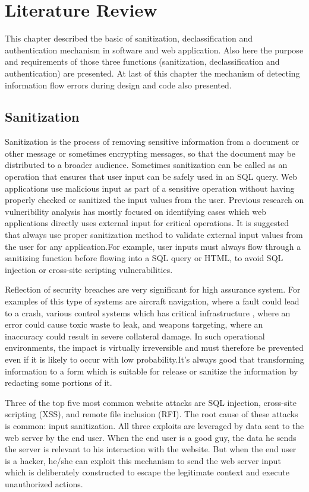 \chapter{Literature Review}
This chapter described the basic of sanitization, declassification and authentication mechanism in software and web application. Also here the purpose and requirements of those three functions (sanitization, declassification and authentication) are presented. At last of this chapter the mechanism of detecting information flow errors during design and code also presented.

\section{Sanitization}
Sanitization is the process of removing sensitive information from a document or other message or sometimes encrypting messages, so that the document may be distributed to a broader audience. Sometimes sanitization can be called as an operation that ensures that user input can be safely used in an SQL query. Web applications use malicious input as part of a sensitive operation without having properly checked or sanitized the input values from the user. Previous research on vulneribility analysis has mostly focused on identifying cases which web applications directly uses external input for critical operations. It is suggested that always use proper sanitization method to validate external input values from the user for any application.For example, user inputs must always flow through a sanitizing function before flowing into a SQL query or HTML, to avoid SQL injection or cross-site scripting vulnerabilities.

Reflection of security breaches are very significant for high assurance system. For examples of this type of systems are aircraft navigation, where a fault could lead to a crash, various control systems which has critical infrastructure , where an error 
could cause toxic waste to leak, and weapons targeting, where an inaccuracy could result in severe collateral damage. In such
operational environments, the impact is virtually irreversible and must therefore be prevented even if it is likely to occur
with low probability.It's always good that transforming information to a form which is suitable for release or sanitize the information by redacting some portions of it.

Three of the top five most common website attacks are SQL injection, cross-site scripting (XSS), and remote file inclusion (RFI). The root cause of these attacks is common: input sanitization. All three exploits are leveraged by data sent to the web server by the end user. When the end user is a good guy, the data he sends the server is relevant to his interaction with the website. But when the end user is a hacker, he/she can exploit this mechanism to send the web server input which is deliberately constructed to escape the legitimate context and execute unauthorized actions.

